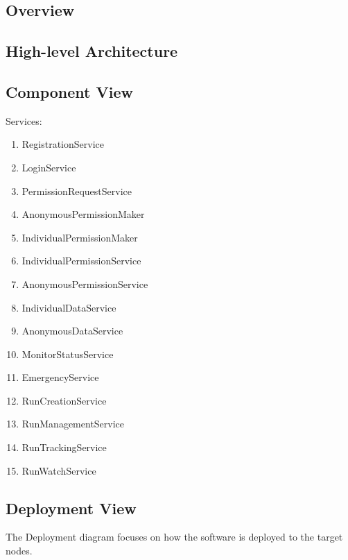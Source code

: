 \documentclass[a4paper]{article}
\begin{document}
\subsection{Overview}

\subsection{High-level Architecture}

\clearpage

\subsection{Component View}
Services:
\begin{enumerate}
    \item RegistrationService
    \item LoginService
    \item PermissionRequestService %
    \item AnonymousPermissionMaker
    \item IndividualPermissionMaker
    \item IndividualPermissionService %
    \item AnonymousPermissionService %
    \item IndividualDataService %
    \item AnonymousDataService %
    
    \item MonitorStatusService
    \item EmergencyService
    
    \item RunCreationService %
    \item RunManagementService %
    \item RunTrackingService %
    \item RunWatchService %
    
\end{enumerate}

\subsection{Deployment View}
The Deployment diagram focuses on how the software is deployed to the target nodes.
\end{document}
